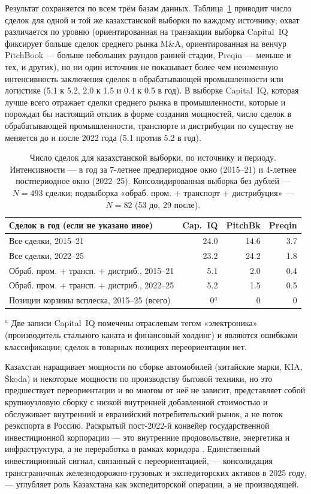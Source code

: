 \documentclass[12pt]{article}
\begin{document}
Результат сохраняется по всем трём базам данных. Таблица~\ref{tab:dealsource} приводит
число сделок для одной и той же казахстанской выборки по каждому источнику; охват
различается по уровню (ориентированная на транзакции выборка Capital~IQ фиксирует больше
сделок среднего рынка M\&A, ориентированная на венчур PitchBook — больше небольших раундов
ранней стадии, Preqin — меньше и тех, и других), но ни один источник не показывает более
чем неизменную интенсивность заключения сделок в обрабатывающей промышленности или
логистике (5.1 к 5.2, 2.0 к 1.5 и 0.4 к 0.5 в год). В выборке Capital~IQ, которая лучше
всего отражает сделки среднего рынка в промышленности, которые и порождал бы настоящий
отклик в форме создания мощностей, число сделок в обрабатывающей промышленности,
транспорте и дистрибуции по существу не меняется до и после 2022 года (5.1 против 5.2 в
год).

\begin{table}[t]
\centering
\caption{Число сделок для казахстанской выборки, по источнику и периоду. Интенсивности — в
год за 7-летнее предпериодное окно (2015--21) и 4-летнее постпериодное окно (2022--25).
Консолидированная выборка без дублей — $N = 493$ сделки; подвыборка «обраб.
пром. + транспорт + дистрибуция» — $N = 82$ (53 до, 29 после).}
\label{tab:dealsource}
\footnotesize
\begin{tabular}{lrrr}
\toprule
Сделок в год (если не указано иное) & Cap.~IQ & PitchBk & Preqin \\
\midrule
Все сделки, 2015--21              & 24.0 & 14.6 & 3.7 \\
Все сделки, 2022--25              & 23.2 & 24.2 & 1.8 \\
Обраб. пром. + трансп. + дистриб., 2015--21 & 5.1 & 2.0 & 0.4 \\
Обраб. пром. + трансп. + дистриб., 2022--25 & 5.2 & 1.5 & 0.5 \\
Позиции корзины всплеска, 2015--25 (всего) & 0$^{a}$ & 0 & 0 \\
\bottomrule
\end{tabular}

\vspace{2pt}
\footnotesize $^{a}$ Две записи Capital~IQ помечены отраслевым тегом «электроника»
(производитель стального каната и финансовый холдинг) и являются ошибками классификации;
сделок в товарных позициях переориентации нет.
\end{table}

Казахстан наращивает мощности по сборке автомобилей (китайские марки, KIA, \v{S}koda) и
некоторые мощности по производству бытовой техники, но это предшествует переориентации и
во многом от неё не зависит, представляет собой крупноузловую сборку с низкой внутренней
добавленной стоимостью и обслуживает внутренний и евразийский потребительский рынок, а не
поток реэкспорта в Россию. Раскрытый пост-2022-й конвейер государственной инвестиционной
корпорации — это внутренние продовольствие, энергетика и инфраструктура, а не переработка в
рамках коридора \citep{qicaifcifc2026pe}. Единственный инвестиционный сигнал, связанный с
переориентацией, — консолидация трансграничных железнодорожно-грузовых и экспедиторских
активов в 2025 году, — углубляет роль Казахстана как экспедиторской операции, а не
производящей.
\end{document}
